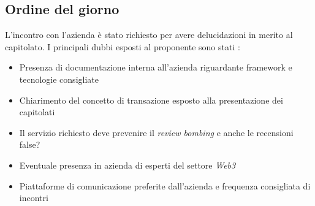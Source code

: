 \subsection{Ordine del giorno}
L'incontro con l'azienda è stato richiesto per avere delucidazioni in merito al capitolato. I principali dubbi esposti al proponente sono stati :
\begin{itemize}
	\item Presenza di documentazione interna all'azienda riguardante framework e tecnologie consigliate
	\item Chiarimento del concetto di transazione esposto alla presentazione dei
	capitolati
	\item Il servizio richiesto deve prevenire il \emph{review bombing} e anche
	le recensioni false?
	\item Eventuale presenza in azienda di esperti del settore \emph{Web3}
	\item Piattaforme di comunicazione preferite dall'azienda e frequenza
	consigliata di incontri
\end{itemize}
